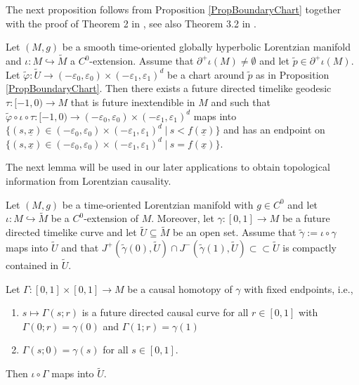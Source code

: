 \documentclass[reqno]{article}
\begin{document}
The next proposition follows from Proposition \ref{PropBoundaryChart} together with the proof of Theorem 2 in \cite{GalLinSbi17}, see also Theorem 3.2 in \cite{Sbie18}.

\begin{proposition}\label{PropGeodesicBoundaryChart}
Let $(M,g)$ be a smooth time-oriented globally hyperbolic Lorentzian manifold and $\iota : M \hookrightarrow \tilde{M}$ a $C^0$-extension. Assume that $\partial^+ \iota(M) \neq \emptyset$ and let $\tilde{p} \in \partial^+ \iota(M)$. Let $\tilde{\varphi} : \tilde{U} \to (-\varepsilon_0, \varepsilon_0) \times (-\varepsilon_1, \varepsilon_1)^d$ be a chart around $\tilde{p}$ as in Proposition \ref{PropBoundaryChart}. Then there exists a future directed timelike geodesic $\tau : [-1,0) \to M$ that is future inextendible in $M$ and such that $\tilde{\varphi} \circ \iota \circ \tau :[-1,0) \to (-\varepsilon_0, \varepsilon_0) \times (-\varepsilon_1, \varepsilon_1)^d$ maps into $\{(s,\underline{x}) \in (-\varepsilon_0, \varepsilon_0) \times (-\varepsilon_1, \varepsilon_1)^{d} \; | \: s < f(\underline{x})\}$ and has an endpoint on $\{(s,\underline{x}) \in (-\varepsilon_0, \varepsilon_0) \times (-\varepsilon_1, \varepsilon_1)^{d} \; | \: s = f(\underline{x})\}$.
\end{proposition}


The next lemma will be used in our later applications to obtain topological information from Lorentzian causality.

\begin{lemma}\label{LemCausalHomotopy}
Let $(M,g)$ be a time-oriented Lorentzian manifold with $g \in C^0$ and let $\iota : M \hookrightarrow \tilde{M}$ be a $C^0$-extension of $M$. Moreover, let $\gamma : [0,1] \to M$ be a future directed timelike curve and let $\tilde{U} \subseteq \tilde{M}$ be an open set. Assume that $\tilde{\gamma} := \iota \circ \gamma$ maps into $\tilde{U}$ and that $J^+(\tilde{\gamma}(0), \tilde{U}) \cap J^-(\tilde{\gamma}(1), \tilde{U}) \subset \subset \tilde{U}$ is compactly contained in $\tilde{U}$.

Let $\Gamma : [0,1] \times [0,1] \to M$ be a causal homotopy of $\gamma$ with fixed endpoints, i.e., \begin{enumerate}
\item $s \mapsto \Gamma(s ; r)$ is a future directed causal curve for all $r \in [0,1]$ with $\Gamma(0;r) = \gamma(0)$ and $\Gamma(1;r) = \gamma(1)$
\item $\Gamma(s;0) = \gamma(s)$ for all $s \in [0,1]$.
\end{enumerate}

Then $\iota \circ \Gamma$ maps into $\tilde{U}$.
\end{lemma} 
\end{document}
